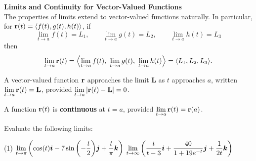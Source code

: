 \documentclass[mathNotesPreamble]{subfiles}
\begin{document}
  \textbf{Limits and Continuity for Vector-Valued Functions}\\
    The properties of limits extend to vector-valued functions naturally. In particular, for ${\mathbf{r}}(t)={\left\langle f(t), g(t), h(t) \right\rangle}$, if
      \[\lim_{t\to a} f(t)=L_1, \qquad \lim_{t\to a} g(t)=L_2, \qquad \lim_{t\to a} h(t)=L_3\]
    then
      \[\lim_{t\to a} {\mathbf{r}}(t)={\left\langle \lim_{t\to a} f(t),\ \lim_{t\to a} g(t),\ \lim_{t\to a} h(t) \right\rangle}={\left\langle L_1,L_2,L_3 \right\rangle}.\]
  \begin{defn*}
    A vector-valued function ${\mathbf{r}}$ approaches the limit $\mathbf L$ as $t$ approaches $a$, written \newline$\displaystyle\lim_{t\to a} {\mathbf{r}}(t)=\mathbf L$, provided $\displaystyle\lim_{t\to a}{\left\vert{\mathbf{r}}(t)-\mathbf L\right\vert}=0$.
    \vspace*{\baselineskip}
    
    A function ${\mathbf{r}}(t)$ is \textbf{continuous} at $t=a$, provided $\displaystyle \lim_{t\to a} {\mathbf{r}}(t)={\mathbf{r}}(a)$.
  \end{defn*}

  \begin{ex*}
    Evaluate the following limits:
    \begin{tasks}[after-item-skip=\stretch{1}, label=](1)
      \task 
        $\displaystyle \lim_{t\to \pi} {\left(\cos(t){\bm{i}}-7\sin{\left(-\frac{t}{2}\right)}{\bm{j}}+\frac{t}{\pi}{\bm{k}}\right)}$
      \task 
        $\displaystyle \lim_{t\to \infty} {\left(\frac{t}{t-3}{\bm{i}}+\frac{40}{1+19e^{-t}}{\bm{j}}+\frac{1}{2t}{\bm{k}}\right)}$
    \end{tasks}
  \end{ex*}

  \pagebreak
  
\end{document}
